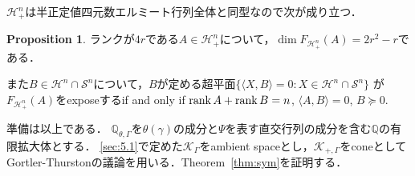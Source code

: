 \documentclass[11pt]{article}
\theoremstyle{definition}
\newtheorem{prop}[defi]{Proposition}
\begin{document}
    $\mathcal{H}^n_+$は半正定値四元数エルミート行列全体と同型なので次が成り立つ．
    \begin{prop} \label{prop:hface}
        ランクが$4r$である$A \in \mathcal{H}^n_+$について，$\dim F_{\mathcal{H}^n_+}(A)=2r^2-r$である．

        また$B \in \mathcal{H}^n \cap \mathcal{S}^n$について，$B$が定める超平面$\{ \langle X,B \rangle=0 : X \in \mathcal{H}^n \cap \mathcal{S}^n\}$
        が$F_{\mathcal{H}^n_+}(A)$をexposeするif and only if
        $\rank A + \rank B = n$, $\langle A,B \rangle=0$, $B \succeq 0$.
    \end{prop}
    準備は以上である．
    $\mathbb{Q}_{\theta, \Gamma}$を$\theta(\gamma)$の成分と$\Psi$を表す直交行列の成分を含む$\mathbb{Q}$の有限拡大体とする．
    \ref{sec:5.1}で定めた$\mathcal{K}_\Gamma$をambient spaceとし，$\mathcal{K}_{+,\Gamma}$をconeとして
    Gortler-Thurstonの議論を用いる．Theorem~\ref{thm:sym}を証明する．
\end{document}
